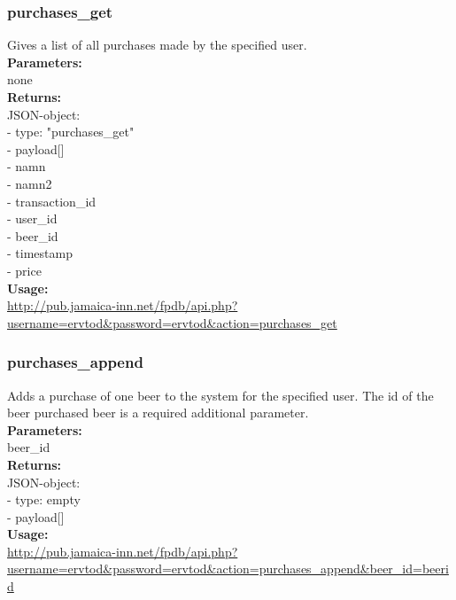 \documentclass{article}
\begin{document}
\subsubsection{purchases\_get}
Gives a list of all purchases made by the specified user.\\
\textbf{Parameters:}\\
none\\
\textbf{Returns:}\\
JSON-object:\\
- type: "purchases\_get"\\
- payload[]\\
\indent  - namn\\
\indent  - namn2\\
\indent  - transaction\_id\\
\indent  - user\_id\\
\indent  - beer\_id\\
\indent  - timestamp\\
\indent  - price\\
\textbf{Usage:}\\
\url{http://pub.jamaica-inn.net/fpdb/api.php?username=ervtod\&password=ervtod\&action=purchases\_get}\\
    
\subsubsection{purchases\_append}
Adds a purchase of one beer to the system for the specified user. The id of the beer purchased beer is a required additional parameter.\\
\textbf{Parameters:}\\
beer\_id\\
\textbf{Returns:}\\
JSON-object:\\
- type: empty\\
- payload[]\\
\textbf{Usage:}\\
\url{http://pub.jamaica-inn.net/fpdb/api.php?username=ervtod\&password=ervtod\&action=purchases\_append\&beer\_id=beerid}\\
  
\end{document}
